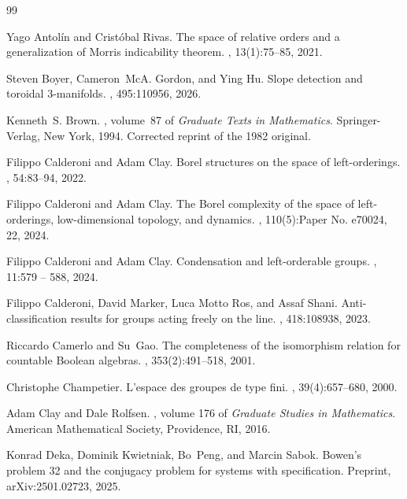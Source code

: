 \documentclass{amsart}
\theoremstyle{definition}
\theoremstyle{remark}
\begin{document}
\begin{thebibliography}{99}

Yago Antol\'in and Crist\'obal Rivas.
\newblock The space of relative orders and a generalization of {M}orris indicability theorem.
, 13(1):75--85, 2021.

Steven Boyer, Cameron~McA. Gordon, and Ying Hu.
\newblock Slope detection and toroidal 3-manifolds.
, 495:110956, 2026.

Kenneth~S. Brown.
, volume~87 of {\em Graduate Texts in Mathematics}.
\newblock Springer-Verlag, New York, 1994.
\newblock Corrected reprint of the 1982 original.

Filippo Calderoni and Adam Clay.
\newblock Borel structures on the space of left-orderings.
, 54:83--94, 2022.

Filippo Calderoni and Adam Clay.
\newblock The {B}orel complexity of the space of left-orderings, low-dimensional topology, and dynamics.
, 110(5):Paper No. e70024, 22, 2024.

Filippo Calderoni and Adam Clay.
\newblock Condensation and left-orderable groups.
, 11:579 -- 588, 2024.

Filippo Calderoni, David Marker, Luca {Motto Ros}, and Assaf Shani.
\newblock Anti-classification results for groups acting freely on the line.
, 418:108938, 2023.

Riccardo Camerlo and Su~Gao.
\newblock The completeness of the isomorphism relation for countable {B}oolean algebras.
, 353(2):491--518, 2001.

Christophe Champetier.
\newblock L’espace des groupes de type fini.
, 39(4):657--680, 2000.

Adam Clay and Dale Rolfsen.
, volume 176 of {\em Graduate Studies in Mathematics}.
\newblock American Mathematical Society, Providence, RI, 2016.

Konrad Deka, Dominik Kwietniak, Bo~Peng, and Marcin Sabok.
\newblock Bowen's problem 32 and the conjugacy problem for systems with specification.
\newblock Preprint, arXiv:2501.02723, 2025.


\end{thebibliography}
\end{document}
